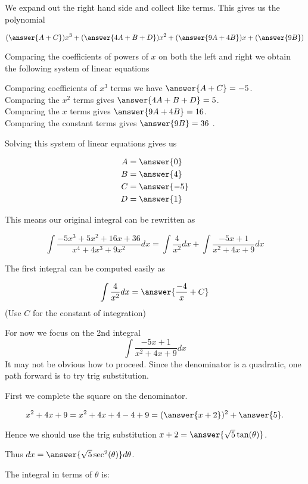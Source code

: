 \documentclass{ximera}
\begin{document}
\begin{exercise}
\begin{exercise}
We expand out the right hand side and collect like terms. This gives us the polynomial

\[
(\answer{A+C})x^3+(\answer{4A+B+D})x^2+(\answer{9A+4B})x+(\answer{9B})
\]


\begin{exercise}

Comparing the coefficients of powers of $x$ on both the left and right we obtain the following system of linear equations

Comparing coefficients of $x^3$ terms we have $\answer{A+C}=-5$. \\
Comparing the $x^2$ terms gives $\answer {4A+B+D}=5$. \\
Comparing the $x$ terms gives $\answer{9A+4B}=16$. \\
Comparing the constant terms gives $\answer{9B}=36$ .

Solving this system of linear equations gives us

\begin{align*}
A&=\answer{  0 }\\
B&=\answer{4   }\\
C&=\answer{  -5 }\\
D&=\answer{1    }
\end{align*}


This means our original integral can be rewritten as 

\[
\int \frac{-5x^3+5x^2+16x+36}{x^{4}+4x^3+9x^2} dx= \int \frac{4}{x^2} dx + \int \frac{-5x+1}{x^2+4x+9} dx 
\]

The first integral can be computed easily as

\[
\int \frac{4}{x^2} dx=\answer{\frac{-4}{x}+C}
\]
(Use $C$ for the constant of integration)

\begin{exercise}

For now we focus on the 2nd integral 
\[
\int \frac{-5x+1}{x^2+4x+9} dx 
\]
It may not be obvious how to proceed. Since the denominator is a quadratic, one path forward is to try trig substitution.

First we complete the square on the denominator. 

\[
x^2+4x+9=x^2+4x+4-4+9=(\answer{x+2})^2+\answer{5}.
\]

Hence we should use the trig substitution $x+2=\answer{\sqrt{5}\tan(\theta)}$. 

Thus $dx=\answer{ \sqrt{5} \sec^{2}(\theta)} d\theta$. 

The integral in terms of $\theta$ is:


\end{exercise}
\end{exercise}
\end{exercise}
\end{exercise}
\end{document}
